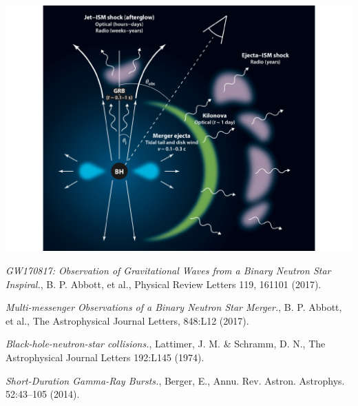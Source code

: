 \documentclass[twocolumn]{article}
\begin{document}
\begin{center}
\includegraphics[width=\columnwidth]{KN_scematic_berger.pdf}
\end{center}



\begin{thebibliography}{9}
 \emph{GW170817: Observation of Gravitational Waves from a Binary Neutron Star Inspiral.},
B. P. Abbott, et al., Physical Review Letters 119, 161101 (2017).

 \emph{Multi-messenger Observations of a Binary Neutron Star Merger.},
B. P. Abbott, et al., The Astrophysical Journal Letters, 848:L12 (2017).

 \emph{Black-hole-neutron-star collisions.},
Lattimer, J. M. \& Schramm, D. N., The Astrophysical Journal Letters 192:L145 (1974).

 \emph{Short-Duration Gamma-Ray Bursts.},
Berger, E., Annu. Rev. Astron. Astrophys. 52:43–105 (2014).


\end{thebibliography}
\end{document}
